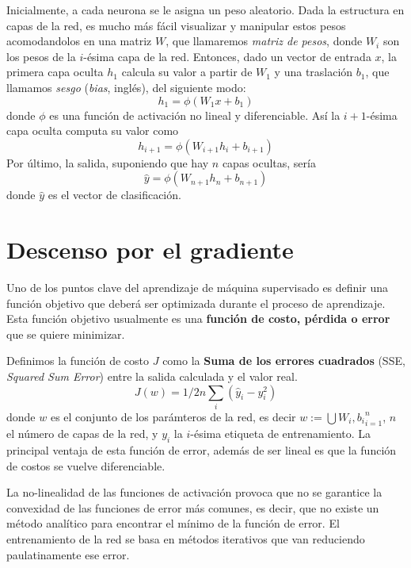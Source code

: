 Inicialmente, a cada neurona se le asigna un peso aleatorio. Dada la
estructura en capas de la red, es mucho más fácil visualizar y
manipular estos pesos acomodandolos en una matriz $W$, que llamaremos
\textit{matriz de pesos}, donde $W_i$ son los pesos de la $i$-ésima
capa de la red. Entonces, dado un vector de entrada $x$, la primera
capa oculta $h_1$ calcula su valor a partir de $W_1$ y una traslación
$b_1$, que llamamos \textit{sesgo} (\textit{bias}, inglés), del
siguiente modo:
\begin{equation}
  h_1 = \phi(W_1x + b_1)
\end{equation}
donde $\phi$ es una función de activación no lineal y
diferenciable. Así la $i+1$-ésima capa oculta computa su valor como
\begin{equation}
  h_{i+1} = \phi(W_{i+1}h_i + b_{i+1})
\end{equation}
Por último, la salida, suponiendo que hay $n$ capas ocultas, sería
\begin{equation}
  \hat{y} = \phi{(W_{n+1}h_n + b_{n+1})}
\end{equation}
donde $\hat{y}$ es el vector de clasificación.

\section{Descenso por el gradiente}
Uno de los puntos clave del aprendizaje de máquina supervisado es
definir una función objetivo que deberá ser optimizada durante el
proceso de aprendizaje. Esta función objetivo usualmente es una
\textbf{función de costo, pérdida o error} que se quiere minimizar.

Definimos la función de costo $J$ como la \textbf{Suma de los errores
  cuadrados} (SSE, \textit{Squared Sum Error}) entre la salida
  calculada y el valor real.
\begin{equation}
  J(w)=1/2n \sum_i (\hat{y}_i - y_i^2)
\end{equation}
donde $w$ es el conjunto de los parámteros de la red, es decir
$w:=\bigcup{W_i, b_i}_{i=1}^{n}$, $n$ el número de capas de la red, y
$y_i$ la $i$-ésima etiqueta de entrenamiento. La principal ventaja de
esta función de error, además de ser lineal es que la función de
costos se vuelve diferenciable.

La no-linealidad de las funciones de activación provoca que no se
garantice la convexidad de las funciones de error más comunes, es
decir, que no existe un método analítico para encontrar el mínimo de
la función de error. El entrenamiento de la red se basa en métodos
iterativos que van reduciendo paulatinamente ese error.

